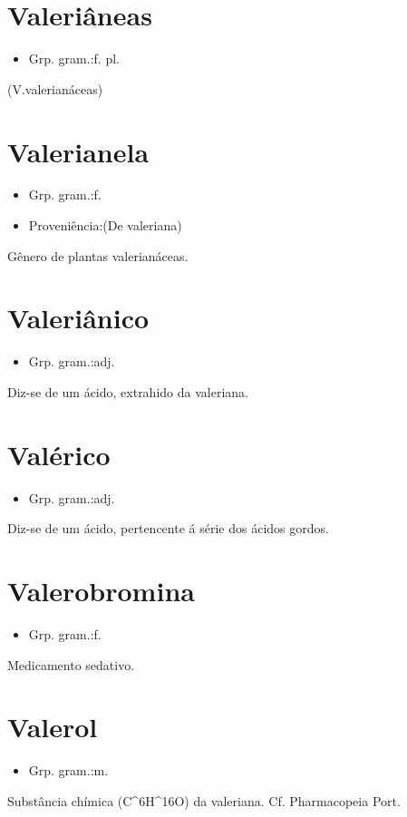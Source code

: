 \documentclass{article}
\begin{document}
\section{Valeriâneas}
\begin{itemize}
\item {Grp. gram.:f. pl.}
\end{itemize}
(V.valerianáceas)
\section{Valerianela}
\begin{itemize}
\item {Grp. gram.:f.}
\end{itemize}
\begin{itemize}
\item {Proveniência:(De \textunderscore valeriana\textunderscore )}
\end{itemize}
Gênero de plantas valerianáceas.
\section{Valeriânico}
\begin{itemize}
\item {Grp. gram.:adj.}
\end{itemize}
Diz-se de um ácido, extrahido da valeriana.
\section{Valérico}
\begin{itemize}
\item {Grp. gram.:adj.}
\end{itemize}
Diz-se de um ácido, pertencente á série dos ácidos gordos.
\section{Valerobromina}
\begin{itemize}
\item {Grp. gram.:f.}
\end{itemize}
Medicamento sedativo.
\section{Valerol}
\begin{itemize}
\item {Grp. gram.:m.}
\end{itemize}
Substância chímica (C^6H^{16}O) da valeriana. Cf. \textunderscore Pharmacopeia Port.\textunderscore 
\end{document}
